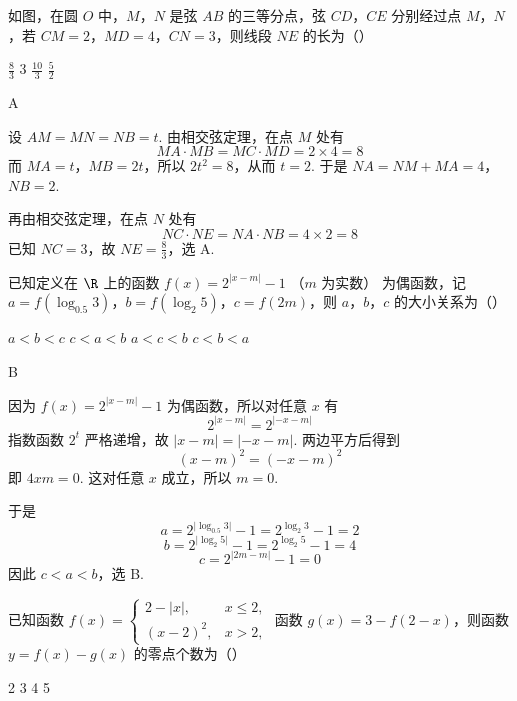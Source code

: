 \begin{problem}
如图，在圆 \(O\) 中，\(M\)，\(N\) 是弦 \(AB\) 的三等分点，弦 \(CD\)，\(CE\) 分别经过点 \(M\)，\(N\)，若 \(CM = 2\)，\(MD = 4\)，\(CN = 3\)，则线段 \(NE\) 的长为（\quad）


\choices
    {\(\frac{8}{3}\)}
    {3}
    {\( \frac{10}{3} \)}
    {\( \frac{5}{2} \)}
\end{problem}

\begin{answer}
A
\end{answer}

\begin{solution}
设 \(AM=MN=NB=t\). 由相交弦定理，在点 \(M\) 处有
\[
MA\cdot MB=MC\cdot MD=2\times4=8
\]
而 \(MA=t\)，\(MB=2t\)，所以 \(2t^2=8\)，从而 \(t=2\). 于是 \(NA=NM+MA=4\)，\(NB=2\).

再由相交弦定理，在点 \(N\) 处有
\[
NC\cdot NE=NA\cdot NB=4\times2=8
\]
已知 \(NC=3\)，故 \(NE=\frac{8}{3}\)，选 A.
\end{solution}

\begin{problem}
已知定义在 \(\R\) 上的函数 \(f(x) = 2^{|x - m|} - 1\) （\(m\) 为实数） 为偶函数，记 \(a = f(\log_{0.5}3)\)，\(b = f(\log_2 5)\)，\(c = f(2m)\)，则 \(a\)，\(b\)，\(c\) 的大小关系为（\quad）

\choices
    {\(a < b < c\)}
    {\(c < a < b\)}
    {\(a < c < b\)}
    {\(c < b < a\)}
\end{problem}

\begin{answer}
B
\end{answer}

\begin{solution}
因为 \(f(x)=2^{\lvert x-m\rvert}-1\) 为偶函数，所以对任意 \(x\) 有
\[
2^{\lvert x-m\rvert}=2^{\lvert -x-m\rvert}
\]
指数函数 \(2^t\) 严格递增，故 \(\lvert x-m\rvert=\lvert -x-m\rvert\). 两边平方后得到
\[
(x-m)^2=(-x-m)^2
\]
即 \(4xm=0\). 这对任意 \(x\) 成立，所以 \(m=0\).

于是
\[
a=2^{\lvert\log_{0.5}3\rvert}-1=2^{\log_2 3}-1=2
\]
\[
b=2^{\lvert\log_2 5\rvert}-1=2^{\log_2 5}-1=4
\]
\[
c=2^{\lvert2m-m\rvert}-1=0
\]
因此 \(c<a<b\)，选 B.
\end{solution}

\begin{problem}
已知函数 \( f(x) = \begin{cases}
2 - |x|, & x \leqslant 2,\\
(x - 2)^2, & x > 2,
\end{cases} \) 函数 \( g(x) = 3 - f(2 - x) \)，则函数 \( y = f(x) - g(x) \) 的零点个数为（\quad）

\choices
    {2}
    {3}
    {4}
    {5}
\end{problem}

